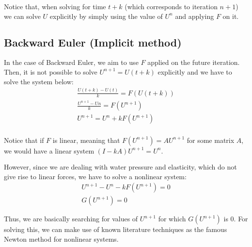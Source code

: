 \documentclass[12pt]{article}
\begin{document}
Notice that, when solving for time $t+k$ (which corresponds to iteration $n+1$) we can solve $U$ explicitly by simply using the value of $U^n$ and applying $F$ on it.

\subsection{Backward Euler (Implicit method)}
In the case of Backward Euler, we aim to use $F$ applied on the future iteration. Then, it is not possible to solve $U^{n+1} = U(t+k)$ explicitly and we have to solve the system below:
\begin{align*}
  \frac{U(t+k) - U(t)}{k} = F(U(t+k))\\
  \frac{U^{n+1} - U{n}}{k} = F(U^{n+1})\\
  U^{n+1} = U^{n} + k F(U^{n+1})\\
\end{align*}

Notice that if $F$ is linear, meaning that $F(U^{n+1}) = A U^{n+1}$ for some matrix $A$, we would have a linear system $(I - k A)U^{n+1} = U^{n}$.

However, since we are dealing with water pressure and elasticity, which do not give rise to linear forces, we have to solve a nonlinear system:
\begin{align*}
  U^{n+1} - U^{n} - k F(U^{n+1}) = 0\\
  G(U^{n+1}) = 0
\end{align*}

Thus, we are basically searching for values of $U^{n+1}$ for which $G(U^{n+1})$ is $0$. For solving this, we can make use of known literature techniques as the famous Newton method for nonlinear systems.
\end{document}
